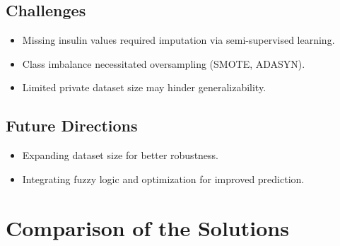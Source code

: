 \subsection*{Challenges}
\begin{itemize}
    \item Missing insulin values required imputation via semi-supervised learning.
    \item Class imbalance necessitated oversampling (SMOTE, ADASYN).
    \item Limited private dataset size may hinder generalizability.
\end{itemize}

\subsection*{Future Directions}
\begin{itemize}
    \item Expanding dataset size for better robustness.
    \item Integrating fuzzy logic and optimization for improved prediction.
\end{itemize}
\newpage
\section{Comparison of the Solutions}

